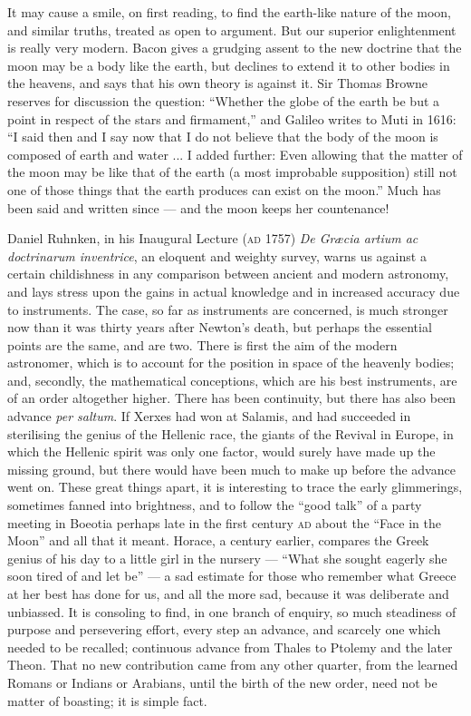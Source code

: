 \documentclass[a4paper, 11pt, oneside, polutonikogreek, english]{article}
\begin{document}
It may cause a smile, on first reading, to find the earth-like nature of the moon, and similar truths, treated as open to argument. But our superior enlightenment is really very modern. Bacon gives a grudging assent to the new doctrine that the moon may be a body like the earth, but declines to extend it to other bodies in the heavens, and says that his own theory is against it. Sir Thomas Browne reserves for discussion the question: ``Whether the globe of the earth be but a point in respect of the stars and firmament,'' and Galileo writes to Muti in 1616: ``I said then and I say now that I do not believe that the body of the moon is composed of earth and water ... I added further: Even allowing that the matter of the moon may be like that of the earth (a most improbable supposition) still not one of those things that the earth produces can exist on the moon.'' Much has been said and written since --- and the moon keeps her countenance!

Daniel Ruhnken, in his Inaugural Lecture (\textsc{ad} 1757) \emph{De Græcia artium ac doctrinarum inventrice}, an eloquent and weighty survey, warns us against a certain childishness in any comparison between ancient and modern astronomy, and lays stress upon the gains in actual knowledge and in increased accuracy due to instruments. The case, so far as instruments are concerned, is much stronger now than it was thirty years after Newton's death, but perhaps the essential points are the same, and are two. There is first the aim of the modern astronomer, which is to account for the position in space of the heavenly bodies; and, secondly, the mathematical conceptions, which are his best instruments, are of an order altogether higher. There has been continuity, but there has also been advance \emph{per saltum}. If Xerxes had won at Salamis, and had succeeded in sterilising the genius of the Hellenic race, the giants of the Revival in Europe, in which the Hellenic spirit was only one factor, would surely have made up the missing ground, but there would have been much to make up before the advance went on. These great things apart, it is interesting to trace the early glimmerings, sometimes fanned into brightness, and to follow the ``good talk'' of a party meeting in Boeotia perhaps late in the first century \textsc{ad} about the ``Face in the Moon'' and all that it meant. Horace, a century earlier, compares the Greek genius of his day to a little girl in the nursery --- ``What she sought eagerly she soon tired of and let be'' --- a sad estimate for those who remember what Greece at her best has done for us, and all the more sad, because it was deliberate and unbiassed. It is consoling to find, in one branch of enquiry, so much steadiness of purpose and persevering effort, every step an advance, and scarcely one which needed to be recalled; continuous advance from Thales to Ptolemy and the later Theon. That no new contribution came from any other quarter, from the learned Romans or Indians or Arabians, until the birth of the new order, need not be matter of boasting; it is simple fact.
\end{document}
